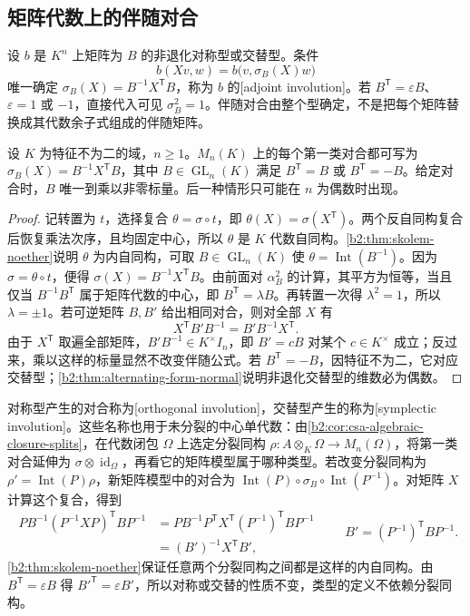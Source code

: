 \subsection{矩阵代数上的伴随对合}
\label{b2:subsec:B03:02}

设 \(b\) 是 \(K^n\) 上矩阵为 \(B\) 的非退化对称型或交替型。条件
\[
	b(Xv,w)=b\bigl(v,\sigma_B(X)w\bigr)
\]
唯一确定 \(\sigma_B(X)=B^{-1}X^{\mathsf T}B\)，称为 \(b\) 的[adjoint involution]。若 \(B^{\mathsf T}=\varepsilon B\)、\(\varepsilon=1\) 或 \(-1\)，直接代入可见 \(\sigma_B^2=1\)。伴随对合由整个型确定，不是把每个矩阵替换成其代数余子式组成的伴随矩阵。

\begin{theorem}\label{b2:thm:B-split-involutions}
	设 \(K\) 为特征不为二的域，\(n\ge1\)。\(M_n(K)\) 上的每个第一类对合都可写为 \(\sigma_B(X)=B^{-1}X^{\mathsf T}B\)，其中 \(B\in\operatorname{GL}_n(K)\) 满足 \(B^{\mathsf T}=B\) 或 \(B^{\mathsf T}=-B\)。给定对合时，\(B\) 唯一到乘以非零标量。后一种情形只可能在 \(n\) 为偶数时出现。
\end{theorem}
\begin{proof}
	记转置为 \(t\)，选择复合 \(\theta=\sigma\circ t\)，即 \(\theta(X)=\sigma(X^{\mathsf T})\)。两个反自同构复合后恢复乘法次序，且均固定中心，所以 \(\theta\) 是 \(K\) 代数自同构。\cref{b2:thm:skolem-noether}说明 \(\theta\) 为内自同构，可取 \(B\in\operatorname{GL}_n(K)\) 使 \(\theta=\operatorname{Int}(B^{-1})\)。因为 \(\sigma=\theta\circ t\)，便得 \(\sigma(X)=B^{-1}X^{\mathsf T}B\)。由前面对 \(\alpha_B^2\) 的计算，其平方为恒等，当且仅当 \(B^{-1}B^{\mathsf T}\) 属于矩阵代数的中心，即 \(B^{\mathsf T}=\lambda B\)。再转置一次得 \(\lambda^2=1\)，所以 \(\lambda=\pm1\)。若可逆矩阵 \(B,B'\) 给出相同对合，则对全部 \(X\) 有
	\[
		X^{\mathsf T}B'B^{-1}=B'B^{-1}X^{\mathsf T}.
	\]
	由于 \(X^{\mathsf T}\) 取遍全部矩阵，\(B'B^{-1}\in K^\times I_n\)，即 \(B'=cB\) 对某个 \(c\in K^\times\) 成立；反过来，乘以这样的标量显然不改变伴随公式。若 \(B^{\mathsf T}=-B\)，因特征不为二，它对应交替型；\cref{b2:thm:alternating-form-normal}说明非退化交替型的维数必为偶数。
\end{proof}

对称型产生的对合称为[orthogonal involution]，交替型产生的称为[symplectic involution]。这些名称也用于未分裂的中心单代数：由\cref{b2:cor:csa-algebraic-closure-splits}，在代数闭包 \(\Omega\) 上选定分裂同构 \(\rho:A\otimes_K\Omega\rightarrow M_n(\Omega)\)，将第一类对合延伸为 \(\sigma\otimes\operatorname{id}_\Omega\)，再看它的矩阵模型属于哪种类型。若改变分裂同构为 \(\rho'=\operatorname{Int}(P)\rho\)，新矩阵模型中的对合为 \(\operatorname{Int}(P)\circ\sigma_B\circ\operatorname{Int}(P^{-1})\)。对矩阵 \(X\) 计算这个复合，得到
\[
	\begin{aligned}
		P B^{-1}(P^{-1}XP)^{\mathsf T}BP^{-1} &=P B^{-1}P^{\mathsf T}X^{\mathsf T}(P^{-1})^{\mathsf T}BP^{-1}\\
		&=(B')^{-1}X^{\mathsf T}B',
	\end{aligned}
	\qquad B'=(P^{-1})^{\mathsf T}BP^{-1}.
\]
\cref{b2:thm:skolem-noether}保证任意两个分裂同构之间都是这样的内自同构。由 \(B^{\mathsf T}=\varepsilon B\) 得 \(B'^{\mathsf T}=\varepsilon B'\)，所以对称或交替的性质不变，类型的定义不依赖分裂同构。

